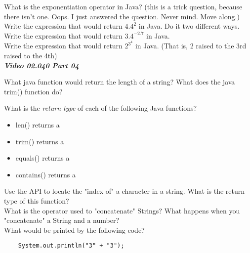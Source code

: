 \documentclass[letterpaper,11pt]{exam}
\newcommand{\videoheading}[1]{\Large\textbf{\textit{#1}}}
\begin{document}
\begin{questions}
\question What is the exponentiation operator in Java?  (this is a trick question, because there isn't one.  Oops.  I just answered the question.  Never mind.  Move along.)
\question Write the expression that would return $4.4^2$ in Java.  Do it two different ways.
\\
\question Write the expression that would return $3.4^{-2.7}$ in Java.
\\
\question Write the expression that would return $2^{3^4}$ in Java.  (That is, 2 raised to the 3rd raised to the 4th)
\\
\videoheading{Video 02.040 Part 04}

\question What java function would return the length of a string? \makebox[2cm]{\hrulefill}
\question What does the java trim() function do?
\\
\begin{samepage}
\question What is the \textit{return type} of each of the following Java functions?
\begin{itemize}
  \item len() returns a \makebox[2cm]{\hrulefill}
  \item trim() returns a \makebox[2cm]{\hrulefill}
  \item equals() returns a \makebox[2cm]{\hrulefill}
  \item contains() returns a \makebox[2cm]{\hrulefill}
\end{itemize}
\end{samepage}
\question Use the API to locate the "index of" a character in a string.  What is the return type of this function?
\\
\question What is the operator used to "concatenate" Strings? \makebox[2cm]{\hrulefill}
\question What happens when you "concatenate" a String and a number?
\\
\question What would be printed by the following code?
\begin{verbatim}
    System.out.println("3" + "3");
\end{verbatim}
\end{questions}
\end{document}
